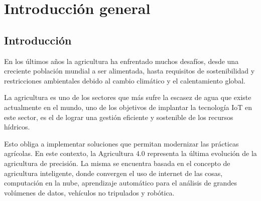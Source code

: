 
\chapter{Introducción general} %

\label{Chapter1} %
\label{IntroGeneral}


\newcommand{\keyword}[1]{\textbf{#1}}
\newcommand{\tabhead}[1]{\textbf{#1}}
\newcommand{\code}[1]{\texttt{#1}}
\newcommand{\file}[1]{\texttt{\bfseries#1}}
\newcommand{\option}[1]{\texttt{\itshape#1}}
\newcommand{\grados}{$^{\circ}$}



\section{Introducción}
En los últimos años la agricultura ha enfrentado muchos desafíos, desde una creciente población mundial a ser alimentada, hasta requisitos de sostenibilidad y restricciones ambientales debido al cambio climático y el calentamiento global.

La agricultura es uno de los sectores que más sufre la escasez de agua que existe actualmente en el mundo, uno de los objetivos de implantar la tecnología IoT en este sector, es el de lograr una gestión eficiente y sostenible de los recursos hídricos.

Esto obliga a implementar soluciones que permitan modernizar las prácticas agrícolas. En este contexto, la Agricultura 4.0 representa la última evolución de la  agricultura de precisión. La misma se encuentra basada en el concepto de agricultura inteligente, donde convergen el uso de internet de las cosas, computación
en la nube, aprendizaje automático para el análisis de grandes volúmenes de datos, vehículos no tripulados y robótica.

